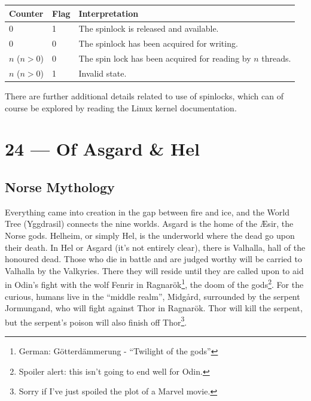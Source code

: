 \documentclass[a4paper]{report}
\begin{document}
\begin{center}
	\begin{tabular}{l|l|l}
		\textbf{Counter} & \textbf{Flag} & \textbf{Interpretation}                                     \\\hline
		0                & 1             & The spinlock is released and available.                     \\
		0                & 0             & The spinlock has been acquired for writing.                 \\
		$n$ ($n > 0$)    & 0             & The spin lock has been acquired for reading by $n$ threads. \\
		$n$ ($n > 0$)    & 1             & Invalid state.                                              \\
	\end{tabular}
\end{center}

There are further additional details related to use of spinlocks, which can of course be explored by reading the Linux kernel documentation.









\chapter*{24 --- Of Asgard \& Hel}


\section*{Norse Mythology}
Everything came into creation in the gap between fire and ice, and the World Tree (Yggdrasil) connects the nine worlds. Asgard is the home of the \AE sir, the Norse gods. Helheim, or simply Hel, is the underworld where the dead go upon their death. In Hel or Asgard (it's not entirely clear), there is Valhalla, hall of the honoured dead. Those who die in battle and are judged worthy will be carried to Valhalla by the Valkyries. There they will reside until they are called upon to aid in Odin's fight with the wolf Fenrir in Ragnar\"ok\footnote{German: G\"otterd\"ammerung - ``Twilight of the gods''}, the doom of the gods\footnote{Spoiler alert: this isn't going to end well for Odin.}. For the curious, humans live in the ``middle realm'', Midg\aa rd, surrounded by the serpent Jormungand, who will fight against Thor in  Ragnar\"ok. Thor will kill the serpent, but the serpent's poison will also finish off Thor\footnote{Sorry if I've just spoiled the plot of a Marvel movie.}.
\end{document}
